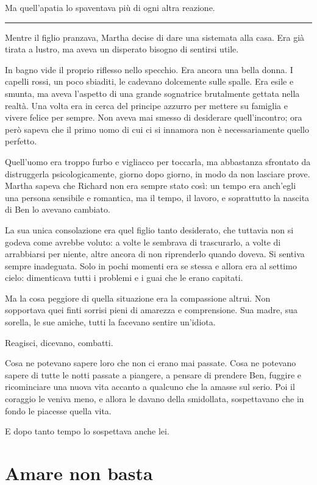 \documentclass[a4paper,11pt,oneside,openright,final]{memoir}
\begin{document}
Ma quell'apatia lo spaventava più di ogni altra reazione.

\plainbreak{1}

Mentre il figlio pranzava, Martha decise di dare una sistemata alla casa. Era
già tirata a lustro, ma aveva un disperato bisogno di sentirsi utile.

In bagno vide il proprio riflesso nello specchio. Era ancora una bella donna. I
capelli rossi, un poco sbiaditi, le cadevano dolcemente sulle spalle. Era esile
e smunta, ma aveva l'aspetto di una grande sognatrice brutalmente gettata nella
realtà. Una volta era in cerca del principe azzurro per mettere su famiglia e
vivere felice per sempre. Non aveva mai smesso di desiderare quell'incontro; ora
però sapeva che il primo uomo di cui ci si innamora non è necessariamente
quello perfetto.

Quell’uomo era troppo furbo e vigliacco per toccarla, ma abbastanza sfrontato
da distruggerla psicologicamente, giorno dopo giorno, in modo da non lasciare
prove. Martha sapeva che Richard non era sempre stato così: un tempo era
anch'egli una persona sensibile e romantica, ma il tempo, il lavoro, e
soprattutto la nascita di Ben lo avevano cambiato.

La sua unica consolazione era quel figlio tanto desiderato, che tuttavia non si
godeva come avrebbe voluto: a volte le sembrava di trascurarlo, a volte di
arrabbiarsi per niente, altre ancora di non riprenderlo quando doveva. Si
sentiva sempre inadeguata. Solo in pochi momenti era se stessa e allora era al
settimo cielo: dimenticava tutti i problemi e i guai che le erano capitati.

Ma la cosa peggiore di quella situazione era la compassione altrui. Non
sopportava quei finti sorrisi pieni di amarezza e comprensione. Sua madre, sua
sorella, le sue amiche, tutti la facevano sentire un'idiota.

Reagisci, dicevano, combatti.

Cosa ne potevano sapere loro che non ci erano mai passate. Cosa ne potevano
sapere di tutte le notti passate a piangere, a pensare di prendere Ben, fuggire
e ricominciare una nuova vita accanto a qualcuno che la amasse sul serio. Poi il
coraggio le veniva meno, e allora le davano della smidollata, sospettavano che
in fondo le piacesse quella vita.

E dopo tanto tempo lo sospettava anche lei.

\chapter{Amare non basta}
\end{document}
